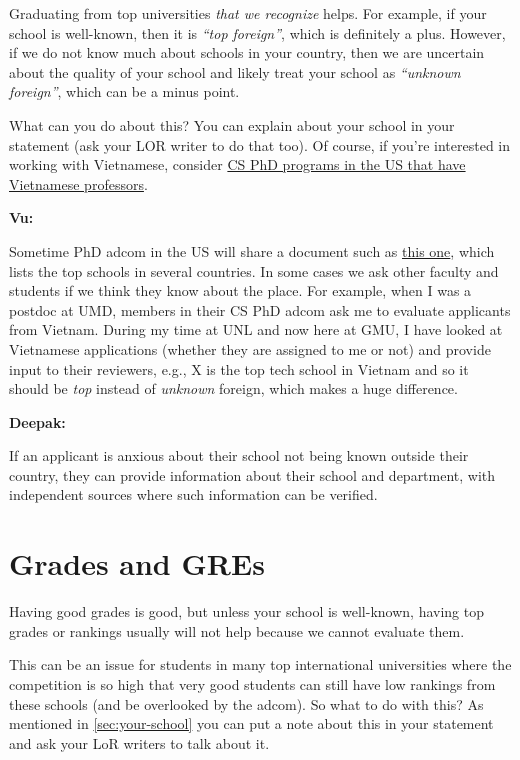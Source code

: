 \documentclass[oneside,11pt]{memoir}
\newenvironment{commentbox}[1][]{
  \small
  \begin{mybox}
    {\small \textbf{#1}}
  }{
  \end{mybox}
}
\begin{document}
Graduating from top universities \emph{that we recognize} helps. For example, if your school is well-known, then it is \emph{``top foreign''}, which is definitely a plus.
However, if we do not know much about schools in your country, then we are uncertain about the quality of your school and  likely treat your school as \emph{``unknown foreign''}, which can be a minus point.


What can you do about this? You can explain about your school in your statement (ask your LOR writer to do that too). Of course, if you're interested in working with Vietnamese, consider  \href{https://github.com/dynaroars/dynaroars.github.io/wiki/Viet-CS-Profs-US}{CS PhD programs in the US that have Vietnamese professors}. %

\begin{commentbox}[Vu:]
  Sometime PhD adcom in the US will share a document such as \href{https://github.com/dynaroars/dynaroars.github.io/wiki/Foreign-Top-Schools}{this one}, which lists the top schools in several countries. In some cases we ask other faculty and students if we think they know about the place.  For example, when I was a postdoc at UMD, members in their CS PhD adcom ask me to evaluate applicants from Vietnam.  During my time at UNL and now here at GMU, I have looked at Vietnamese applications (whether they are assigned to me or not) and provide input to their reviewers, e.g., X is the top tech school in Vietnam and so it should be \emph{top} instead of \emph{unknown} foreign, which makes a huge difference.
\end{commentbox}
\begin{commentbox}[Deepak:] 
  If an applicant is anxious about their school not being known outside their country, they can provide information about their school and department, with independent sources where such information can be verified.
\end{commentbox}

\section{Grades and GREs}\label{sec:grades}


Having good grades is good, but unless your school is well-known, having top grades or rankings
usually will not help because we cannot evaluate them.

This can be an issue for students in many top international universities where the competition is so high that very good students can still have low rankings from these schools (and be overlooked by the adcom).
So what to do with this? As mentioned in \autoref{sec:your-school} you can put a note about this in your statement and ask your LoR writers to talk about it.
\end{document}
